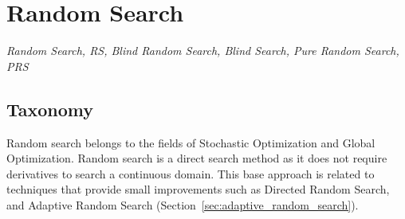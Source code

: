 

\section{Random Search} 
\label{sec:random_search}

\emph{Random Search, RS, Blind Random Search, Blind Search, Pure Random Search, PRS}

\subsection{Taxonomy}
Random search belongs to the fields of Stochastic Optimization and Global Optimization.
Random search is a direct search method as it does not require derivatives to search a continuous domain.
This base approach is related to techniques that provide small improvements such as Directed Random Search, and Adaptive Random Search (Section~\ref{sec:adaptive_random_search}). 

